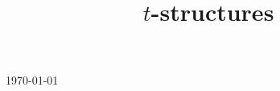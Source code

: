 

\title{$t$-structures}

\usepackage[sort=standard]{glossaries} 
\makeglossaries
\setcounter{tocdepth}{3}



\maketitle
\centerline{\today}
\tableofcontents







